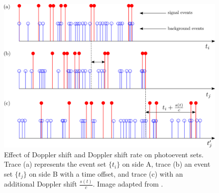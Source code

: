 \begin{figure}[ht!]
	\centering
	\includegraphics[width=0.95\linewidth]{assets/correlation_smear.png}
	\caption{Effect of Doppler shift and Doppler shift rate on photoevent sets. Trace (a) represents the event set $\{t_i\}$ on side  A, trace (b) an event  set $\{t_j\}$ on side B  with a time offset, and trace (c) with an additional Doppler shift $\frac{s(t)}{c}$. Image adapted from \cite{ho2009clock}.}
	\label{fig:correlation_smear}
\end{figure}

